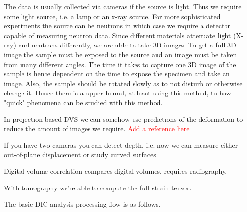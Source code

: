 The data is usually collected via cameras if the source is light. Thus we require some light source, i.e. a lamp or an x-ray source. For more sophisticated experiments the source can be neutrons in which case we require a detector capable of measuring neutron data. Since different materials attenuate light (X-ray) and neutrons differently, we are able to take 3D images. To get a full 3D-image the sample must be exposed to the source and an image must be taken from many different angles. The time it takes to capture one 3D image of the sample is hence dependent on the time to expose the specimen and take an image. Also, the sample should be rotated slowly as to not disturb or otherwise change it. Hence there is a upper bound, at least using this method, to how "quick" phenomena can be studied with this method. 

In projection-based DVS we can somehow use predictions of the deformation to reduce the amount of images we require.
\textcolor{red}{Add a reference here}

If you have two cameras you can detect depth, i.e. now we can measure either out-of-plane displacement or study curved surfaces. 



Digital volume correlation compares digital volumes, requires radiography. 

With tomography we're able to compute the full strain tensor.

The basic DIC analysis processing flow is as follows. 


